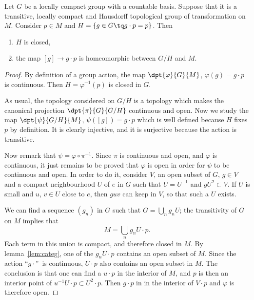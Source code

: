 \begin{theorem} \label{tho:homeo_action}
	Let $G$ be a locally compact group with a countable basis. Suppose that it is a transitive, locally compact and Hausdorff topological group of transformation on $M$. Consider $p\in M$ and $H=\{g\in G\tq g\cdot p=p\}$. Then
	\begin{enumerate}
		\item $H$ is closed,
		\item the map $[g]\to g\cdot p$ is homeomorphic between  $G/H$ and $M$.
	\end{enumerate}
\end{theorem}

\begin{proof}
	By definition of a group action, the map $\dpt{\varphi}{G}{M}$, $\varphi(g)=g\cdot p$ is continuous. Then $H=\varphi^{-1}(p)$ is closed in $G$.

	As usual, the topology considered on $G/H$ is a topology which makes the canonical projection $\dpt{\pi}{G}{G/H}$ continuous and open. Now we study the map $\dpt{\psi}{G/H}{M}$, $\psi([g])=g\cdot p$ which is well defined because $H$ fixes $p$ by definition. It is clearly injective, and it is surjective because the action is transitive.

	Now remark that $\psi=\varphi\circ\pi^{-1}$. Since $\pi$ is continuous and open, and $\varphi$ is continuous, it just remains to be proved that $\varphi$ is open in order for $\psi$ to be continuous and open. In order to do it, consider $V$, an open subset of $G$, $g\in V$ and a compact neighbourhood $U$ of $e$ in $G$ such that $U=U^{-1}$ and $gU^2\subset V$. If $U$ is small and $u$, $v\in U$ close to $e$, then $guv$ can keep in $V$, so that such a $U$ exists.

	We can find a sequence $(g_n)$ in $G$ such that $G=\bigcup_ng_nU$; the transitivity of $G$ on $M$ implies that
	\[
		M=\bigcup_ng_nU\cdot p.
	\]
	Each term in this union is compact, and therefore closed in $M$. By lemma~\ref{lem:categ}, one of the $g_nU\cdot p$ contains an open subset of $M$. Since the action ``$g\cdot$''\ is continuous, $U\cdot p$ also contains an open subset in $M$. The conclusion is that one can find a $u\cdot p$ in the interior of $M$, and $p$ is then an interior point of $u^{-1} U\cdot p\subset U^2\cdot p$. Then $g\cdot p$ in in the interior of $V\cdot p$ and $\varphi$ is therefore open.
\end{proof}


